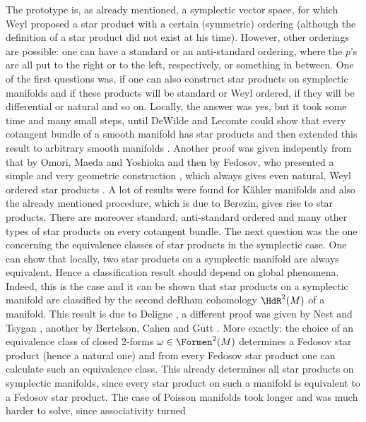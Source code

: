 The prototype is, as already mentioned, a symplectic vector space, for which 
Weyl proposed a star product with a certain (symmetric) ordering (although the 
definition of a star product did not exist at his time). However, other 
orderings are possible: one can have a standard or an anti-standard ordering, 
where the $p$'s are all put to the right or to the left, respectively, or 
something in  between. One of the first questions was, if one can also construct 
star products on symplectic manifolds and if these products will be standard or 
Weyl ordered, if they will be differential or natural and so on. Locally, the 
answer was yes, but it took some time and many small steps, until DeWilde and 
Lecomte could show that every cotangent bundle of a smooth manifold has star 
products \cite{dewilde.lecomte:1983a} and then extended this result to arbitrary 
smooth manifolds \cite{dewilde.lecomte:1983b}. Another proof was given 
indepently from that by Omori, Maeda and Yoshioka 
\cite{omori.maeda.yoshioka:1991a} and then by Fedosov, who presented a simple 
and very geometric construction \cite{fedosov:1994a}, which always gives even 
natural, Weyl ordered star products \cite{bordemann.waldmann:1997a}. A lot of 
results were found for K\"ahler manifolds and also the already mentioned 
procedure, which is due to Berezin, gives rise to star products. There are 
moreover standard, anti-standard ordered and many other types of star products 
on every cotangent bundle. The next question was the one concerning the 
equivalence classes of star products in the symplectic case. One can show that 
locally, two star products on a symplectic manifold are always equivalent. Hence 
a classification result should depend on global phenomena. Indeed, this is the 
case and it can be shown that star products on a symplectic manifold are 
classified by the second deRham cohomology $\HdR^2(M)$ of a manifold. This 
result is due to Deligne \cite{deligne:1995a}, a different proof was given by 
Nest and Tsygan \cite{nest.tsygan:1995a, nest.tsygan:1995a}, another by 
Bertelson, Cahen and Gutt \cite{bertelson.cahen.gutt:1997a}. More exactly: the 
choice of an equivalence class of closed 2-forms $\omega \in \Formen^2(M)$ 
determines a Fedosov star product (hence a natural one) and from every Fedosov 
star product one can calculate such an equivalence class. This already 
determines all star products on symplectic manifolds, since every star product 
on such a manifold is equivalent to a Fedosov star product. The case of Poisson 
manifolds took longer and was much harder to solve, since associativity turned 
